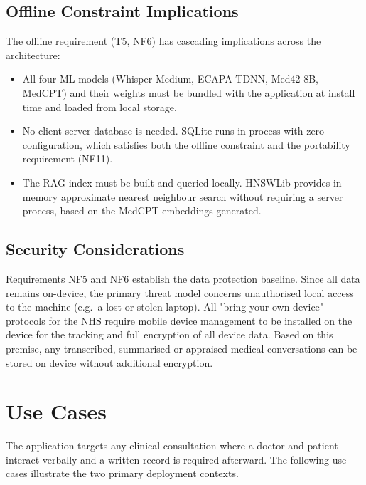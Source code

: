 \subsection{Offline Constraint Implications}
The offline requirement (T5, NF6) has cascading implications across the architecture:

\begin{itemize}
    \item All four ML models (Whisper-Medium, ECAPA-TDNN, Med42-8B, MedCPT) and their weights must be bundled with the application at install time and loaded from local storage.
    \item No client-server database is needed. SQLite runs in-process with zero configuration, which satisfies both the offline constraint and the portability requirement (NF11).
    \item The RAG index must be built and queried locally. HNSWLib provides in-memory approximate nearest neighbour search without requiring a server process, based on the MedCPT embeddings generated.
\end{itemize}

\subsection{Security Considerations}
Requirements NF5 and NF6 establish the data protection baseline. Since all data remains on-device, the primary threat model concerns unauthorised local access to the machine (e.g.\ a lost or stolen laptop). All "bring your own device" protocols for the NHS require mobile device management to be installed on the device for the tracking and full encryption of all device data\cite{nhstd_byod_guidance,ncsc_byod_action5}. Based on this premise, any transcribed, summarised or appraised medical conversations can be stored on device without additional encryption.

\section{Use Cases}

The application targets any clinical consultation where a doctor and patient interact verbally and a written record is required afterward. The following use cases illustrate the two primary deployment contexts.

